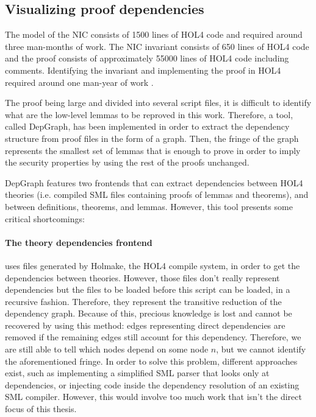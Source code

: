 \documentclass[10pt,a4paper]{article}
\begin{document}
\begin{multicols}{2}
\subsection{Visualizing proof dependencies}

The model of the NIC consists of \num{1500} lines of HOL4 code and required around three man-months of work. The NIC invariant consists of \num{650} lines of HOL4 code and the proof consists of approximately \num{55000} lines of HOL4 code including comments. Identifying the invariant and implementing the proof in HOL4 required around one man-year of work \cite{haglund_trustworthy_nodate}.

The proof being large and divided into several script files, it is difficult to identify what are the low-level lemmas to be reproved in this work. Therefore, a tool, called DepGraph, has been implemented in order to extract the dependency structure from proof files in the form of a graph. Then, the fringe of the graph represents the smallest set of lemmas that is enough to prove in order to imply the security properties by using the rest of the proofs unchanged.

DepGraph features two frontends that can extract dependencies between HOL4 theories (i.e. compiled {SML} files containing proofs of lemmas and theorems), and between definitions, theorems, and lemmas. However, this tool presents some critical shortcomings:

\paragraph{The theory dependencies frontend} uses files generated by Holmake, the HOL4 compile system, in order to get the dependencies between theories. However, those files don't really represent dependencies but the files to be loaded before this script can be loaded, in a recursive fashion. Therefore, they represent the transitive reduction of the dependency graph. Because of this, precious knowledge is lost and cannot be recovered by using this method: edges representing direct dependencies are removed if the remaining edges still account for this dependency. Therefore, we are still able to tell which nodes depend on some node $n$, but we cannot identify the aforementioned fringe. In order to solve this problem, different approaches exist, such as implementing a simplified SML parser that looks only at dependencies, or injecting code inside the dependency resolution of an existing SML compiler. However, this would involve too much work that isn't the direct focus of this thesis.


\end{multicols}
\end{document}
